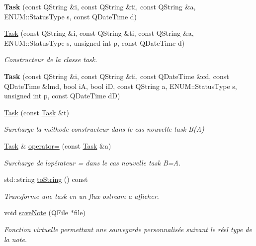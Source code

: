 \begin{DoxyCompactItemize}
\item 
\mbox{\label{class_task_a95bb17f3748a1195967d92e73bba8c7c}} 
{\bfseries Task} (const Q\+String \&i, const Q\+String \&ti, const Q\+String \&a, E\+N\+U\+M\+::\+Status\+Type s, const Q\+Date\+Time d)
\item 
\hyperlink{class_task_a08a0f57803d8ef35f687f23f759e9f0c}{Task} (const Q\+String \&i, const Q\+String \&ti, const Q\+String \&a, E\+N\+U\+M\+::\+Status\+Type s, unsigned int p, const Q\+Date\+Time d)
\begin{DoxyCompactList}\small\item\em Constructeur de la classe task. \end{DoxyCompactList}\item 
\mbox{\label{class_task_a5e397a4f57e750bd8624debc2dba5f4a}} 
{\bfseries Task} (const Q\+String \&i, const Q\+String \&ti, const Q\+Date\+Time \&cd, const Q\+Date\+Time \&lmd, bool iA, bool iD, const Q\+String a, E\+N\+U\+M\+::\+Status\+Type s, unsigned int p, const Q\+Date\+Time dD)
\item 
\mbox{\label{class_task_a0aec5018915f11c96398b75f969a3220}} 
\hyperlink{class_task_a0aec5018915f11c96398b75f969a3220}{Task} (const \hyperlink{class_task}{Task} \&t)
\begin{DoxyCompactList}\small\item\em Surcharge la méthode constructeur dans le cas nouvelle task B(\+A) \end{DoxyCompactList}\item 
\hyperlink{class_task}{Task} \& \hyperlink{class_task_a2430b942d050bf32c771821daa31493f}{operator=} (const \hyperlink{class_task}{Task} \&a)
\begin{DoxyCompactList}\small\item\em Surcharge de l\textquotesingle{}opérateur = dans le cas nouvelle task B=A. \end{DoxyCompactList}\item 
std\+::string \hyperlink{class_task_a7fe5cb7b57a21693e7abfea2f9618563}{to\+String} () const
\begin{DoxyCompactList}\small\item\em Transforme une task en un flux ostream a afficher. \end{DoxyCompactList}\item 
void \hyperlink{class_task_a313eb342d047e8e5cab91bf51609a2f3}{save\+Note} (Q\+File $\ast$file)
\begin{DoxyCompactList}\small\item\em Fonction virtuelle permettant une sauvegarde personnalisée suivant le réel type de la note. \end{DoxyCompactList}\end{DoxyCompactItemize}
